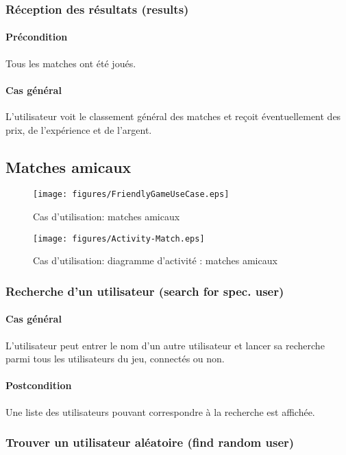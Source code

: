 \subsubsection{Réception des résultats (results)}
	\paragraph{Précondition} Tous les matches ont été joués.
	\paragraph{Cas général} L'utilisateur voit le classement général des matches et reçoit éventuellement des prix, de l'expérience et de l'argent.

\subsection{Matches amicaux}
\begin{figure}[h!]
  \centering
  \texttt{[image: figures/FriendlyGameUseCase.eps]}
  \caption{\label{fig:UC:FriendlyMatch} Cas d'utilisation: matches amicaux}
\end{figure}
\begin{figure}[h!]
  \centering
  \texttt{[image: figures/Activity-Match.eps]}
  \caption{\label{fig:UC:act-FriendlyMatch} Cas d'utilisation: diagramme d'activité : matches amicaux}
\end{figure}

\subsubsection{Recherche d'un utilisateur (search for spec. user)}
\paragraph{Cas général} L'utilisateur peut entrer le nom d'un autre utilisateur et lancer sa recherche parmi tous les utilisateurs du jeu, connectés ou non.
\paragraph{Postcondition} Une liste des utilisateurs pouvant correspondre à la recherche est affichée.

\subsubsection{Trouver un utilisateur aléatoire (find random user)}
